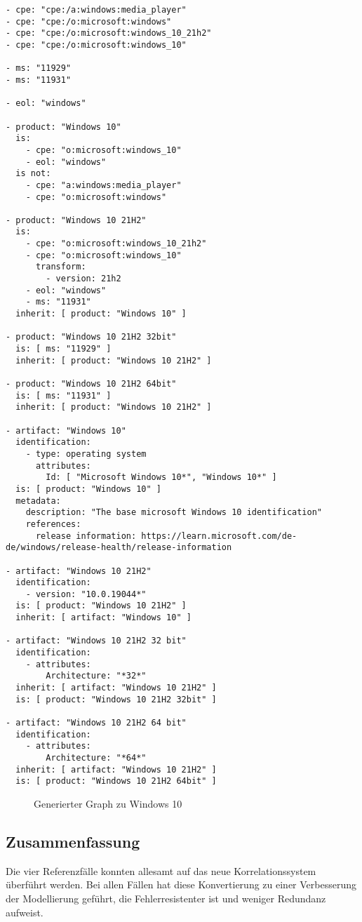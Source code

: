 \begin{lstlisting}[style=yaml,caption={Produktmodellierung zu Windows 10},label={lst:new-correlation-windows},basicstyle=\ttfamily\scriptsize]
- cpe: "cpe:/a:windows:media_player"
- cpe: "cpe:/o:microsoft:windows"
- cpe: "cpe:/o:microsoft:windows_10_21h2"
- cpe: "cpe:/o:microsoft:windows_10"

- ms: "11929"
- ms: "11931"

- eol: "windows"

- product: "Windows 10"
  is:
    - cpe: "o:microsoft:windows_10"
    - eol: "windows"
  is not:
    - cpe: "a:windows:media_player"
    - cpe: "o:microsoft:windows"

- product: "Windows 10 21H2"
  is:
    - cpe: "o:microsoft:windows_10_21h2"
    - cpe: "o:microsoft:windows_10"
      transform:
        - version: 21h2
    - eol: "windows"
    - ms: "11931"
  inherit: [ product: "Windows 10" ]

- product: "Windows 10 21H2 32bit"
  is: [ ms: "11929" ]
  inherit: [ product: "Windows 10 21H2" ]

- product: "Windows 10 21H2 64bit"
  is: [ ms: "11931" ]
  inherit: [ product: "Windows 10 21H2" ]

- artifact: "Windows 10"
  identification:
    - type: operating system
      attributes:
        Id: [ "Microsoft Windows 10*", "Windows 10*" ]
  is: [ product: "Windows 10" ]
  metadata:
    description: "The base microsoft Windows 10 identification"
    references:
      release information: https://learn.microsoft.com/de-de/windows/release-health/release-information

- artifact: "Windows 10 21H2"
  identification:
    - version: "10.0.19044*"
  is: [ product: "Windows 10 21H2" ]
  inherit: [ artifact: "Windows 10" ]

- artifact: "Windows 10 21H2 32 bit"
  identification:
    - attributes:
        Architecture: "*32*"
  inherit: [ artifact: "Windows 10 21H2" ]
  is: [ product: "Windows 10 21H2 32bit" ]

- artifact: "Windows 10 21H2 64 bit"
  identification:
    - attributes:
        Architecture: "*64*"
  inherit: [ artifact: "Windows 10 21H2" ]
  is: [ product: "Windows 10 21H2 64bit" ]
\end{lstlisting}

\begin{figure}[htbp]
    \centering
    \makebox[\textwidth]{}
    \caption{Generierter Graph zu Windows 10}
    \label{fig:example-graph-windows}
\end{figure}

\subsection{Zusammenfassung}\label{subsec:example-results}

Die vier Referenzfälle konnten allesamt auf das neue Korrelationssystem überführt werden.
Bei allen Fällen hat diese Konvertierung zu einer Verbesserung der Modellierung geführt, die Fehlerresistenter ist und weniger Redundanz aufweist.
